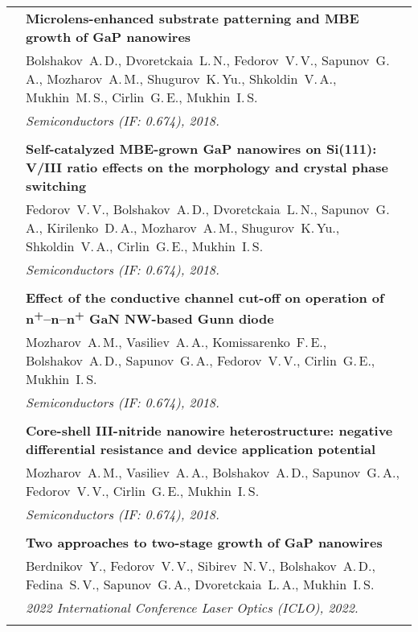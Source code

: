 \documentclass[letterpaper, 11pt]{article}
\begin{document}
\begin{longtable}{p{1.3in}p{4.8in}}
        & \textbf{Microlens-enhanced substrate patterning and MBE growth of GaP
        nanowires} \\
        & Bolshakov~A.\,D., Dvoretckaia~L.\,N., Fedorov~V.\,V., Sapunov~G.\,A.,
        Mozharov~A.\,M., Shugurov~K.\,Yu., Shkoldin~V.\,A., Mukhin~M.\,S.,
        Cirlin~G.\,E., Mukhin~I.\,S. \\
		& \textit{Semiconductors (IF: 0.674), 2018.}\\
		& \\

        & \textbf{Self-catalyzed MBE-grown GaP nanowires on Si(111): V/III
        ratio effects on the morphology and crystal phase switching} \\
        & Fedorov~V.\,V., Bolshakov~A.\,D., Dvoretckaia~L.\,N., Sapunov~G.\,A.,
        Kirilenko~D.\,A., Mozharov~A.\,M., Shugurov~K.\,Yu., Shkoldin~V.\,A.,
        Cirlin~G.\,E., Mukhin~I.\,S. \\
		& \textit{Semiconductors (IF: 0.674), 2018.}\\
		& \\
		
        & \textbf{Effect of the conductive channel cut-off on operation of
        n\textsuperscript{+}--n--n\textsuperscript{+} GaN NW-based Gunn diode}
        \\
        & Mozharov~A.\,M., Vasiliev~A.\,A., Komissarenko~F.\,E.,
        Bolshakov~A.\,D., Sapunov~G.\,A., Fedorov~V.\,V., Cirlin~G.\,E.,
        Mukhin~I.\,S. \\
		& \textit{Semiconductors (IF: 0.674), 2018.}\\
		& \\

        & \textbf{Core-shell III-nitride nanowire heterostructure: negative
        differential resistance and device application potential} \\
        & Mozharov~A.\,M., Vasiliev~A.\,A., Bolshakov~A.\,D., Sapunov~G.\,A.,
        Fedorov~V.\,V., Cirlin~G.\,E., Mukhin~I.\,S. \\
        & \textit{Semiconductors (IF: 0.674), 2018.}\\
		& \\

		\nohyphens{\color{OliveGreen}{Q4 Publications}}
        & \textbf{Two approaches to two-stage growth of GaP nanowires} \\
        & Berdnikov~Y., Fedorov~V.\,V., Sibirev~N.\,V., Bolshakov~A.\,D.,
        Fedina~S.\,V., Sapunov~G.\,A., Dvoretckaia~L.\,A., Mukhin~I.\,S. \\
        & \textit{2022 International Conference Laser Optics (ICLO), 2022.}\\
		& \\


\end{longtable}
\end{document}
